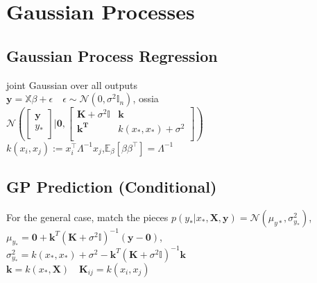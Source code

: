 \section*{Gaussian Processes}

\subsection*{Gaussian Process Regression}
joint Gaussian over all outputs\\
$\mathbf{y}=\mathbb{X}\beta+\epsilon \quad \epsilon\sim \mathcal{N}(0,\sigma^2 \mathbb{I}_n)$, ossia\\
$\mathcal{N}(\begin{bmatrix}
\mathbf{y}\\
y_*\\
\end{bmatrix}|\mathbf{0},\begin{bmatrix}
\mathbf{K}+\sigma^2\mathbb{I} & \mathbf{k} \\
\mathbf{k^T} & k(x_*,x_*) + \sigma^2\\
\end{bmatrix})$\\
$k(x_i,x_j):=x_i^\top\Lambda^{-1}x_j$,$ \mathbb{E}_{\beta}\left[\beta\beta^\top\right]=\Lambda^{-1}$\\

\subsection*{GP Prediction (Conditional)}
For the general case, match the pieces
$p(y_*|x_*,\mathbf{X},\mathbf{y}) = \mathcal{N}(\mu_{y*},\sigma^2_{y_*})$,\\
$\mu_{y_*}=\mathbf{0}+\mathbf{k}^T(\mathbf{K}+\sigma^2\mathbb{I})^{-1}(\mathbf{y - 0})$,\\
$\sigma^2_{y_*}=k(x_*,x_*){+}\sigma^2-\mathbf{k}^T(\mathbf{K}+\sigma^2\mathbb{I})^{-1}\mathbf{k}$\\
$\mathbf{k}=k(x_*,\mathbf{X})\quad \mathbf{K}_{ij}=k(x_i,x_j)$